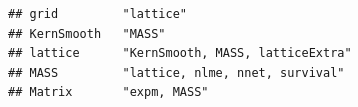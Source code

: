 \documentclass[]{article}
\begin{document}
\begin{verbatim}
## grid         "lattice"                                                                                                                                                                                                                                                                                                                                                                                                                                                                                                                                                                                 
## KernSmooth   "MASS"                                                                                                                                                                                                                                                                                                                                                                                                                                                                                                                                                                                    
## lattice      "KernSmooth, MASS, latticeExtra"                                                                                                                                                                                                                                                                                                                                                                                                                                                                                                                                                          
## MASS         "lattice, nlme, nnet, survival"                                                                                                                                                                                                                                                                                                                                                                                                                                                                                                                                                           
## Matrix       "expm, MASS"                                                                                                                                                                                                                                                                                                                                                                                                                                                                                                                                                                              

\end{verbatim}
\end{document}
